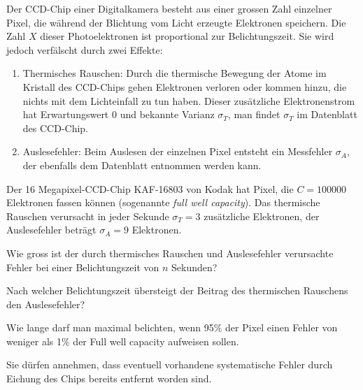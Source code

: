 Der CCD-Chip einer Digitalkamera besteht aus einer grossen Zahl einzelner
Pixel, die während der Blichtung vom Licht erzeugte Elektronen speichern.
Die Zahl $X$ dieser Photoelektronen ist proportional zur Belichtungszeit.
Sie wird jedoch verfälscht durch zwei Effekte:
\begin{enumerate}
\item
Thermisches Rauschen: Durch die thermische Bewegung der Atome
im Kristall des CCD-Chips gehen Elektronen verloren oder kommen hinzu,
die nichts mit dem Lichteinfall zu tun haben. Dieser zusätzliche
Elektronenstrom hat Erwartungswert $0$ und bekannte Varianz $\sigma_T$,
man findet $\sigma_T$ im Datenblatt des CCD-Chip.
\item
Auslesefehler: Beim Auslesen der einzelnen Pixel entsteht ein Messfehler
$\sigma_A$, der ebenfalls dem Datenblatt entnommen werden kann.
\end{enumerate}
Der 16 Megapixel-CCD-Chip KAF-16803 von Kodak hat Pixel, die $C = 100000$
Elektronen fassen können (sogenannte {\it full well capacity}).
Das thermische Rauschen verursacht in jeder
Sekunde $\sigma_T = 3$ zusätzliche Elektronen, der Auslesefehler
beträgt $\sigma_A=9$ Elektronen.
\begin{teilaufgaben}
\item Wie gross ist der durch thermisches Rauschen und Auslesefehler
verursachte Fehler bei einer Belichtungszeit von $n$ Sekunden?
\item Nach welcher Belichtungszeit übersteigt der Beitrag des
thermischen Rauschens den Auslesefehler?
\item Wie lange darf man maximal belichten, wenn 95\% der Pixel einen Fehler
von weniger als 1\% der Full well capacity aufweisen sollen.
\end{teilaufgaben}


\begin{hinweis}
Sie dürfen annehmen, dass eventuell vorhandene systematische
Fehler durch Eichung des Chips bereits entfernt worden sind.
\end{hinweis}

